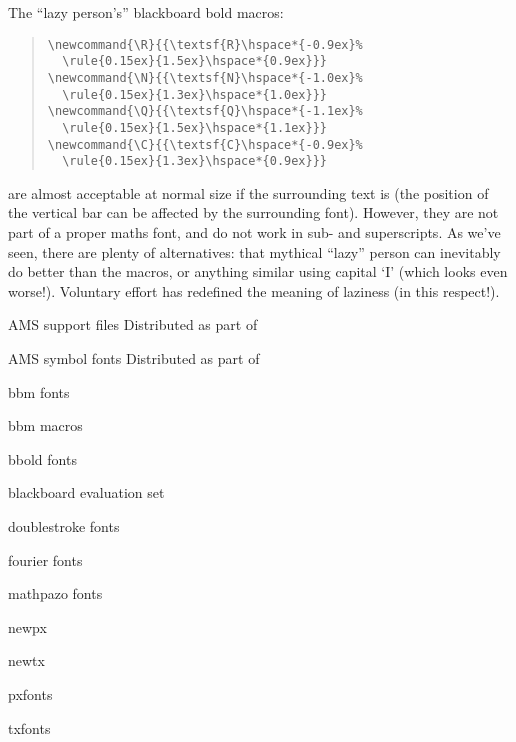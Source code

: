 The ``lazy person's'' blackboard bold macros:
\begin{quote}
\begin{verbatim}
\newcommand{\R}{{\textsf{R}\hspace*{-0.9ex}%
  \rule{0.15ex}{1.5ex}\hspace*{0.9ex}}}
\newcommand{\N}{{\textsf{N}\hspace*{-1.0ex}%
  \rule{0.15ex}{1.3ex}\hspace*{1.0ex}}}
\newcommand{\Q}{{\textsf{Q}\hspace*{-1.1ex}%
  \rule{0.15ex}{1.5ex}\hspace*{1.1ex}}}
\newcommand{\C}{{\textsf{C}\hspace*{-0.9ex}%
  \rule{0.15ex}{1.3ex}\hspace*{0.9ex}}}
\end{verbatim}
\end{quote}
are almost acceptable at normal size if the surrounding text is
 (the position of the vertical bar can be affected by
the surrounding font).  However, they are not part of a proper maths font,
and do not work in sub- and superscripts.  As we've seen, there are
plenty of alternatives: that mythical ``lazy'' person can inevitably
do better than the macros, or anything similar using capital `I'
(which looks even worse!).  Voluntary  \AllTeX{} effort has redefined
the meaning of laziness (in this respect!).
\begin{ctanrefs}
\item[AMS support files]Distributed as part of 
\item[AMS symbol fonts]Distributed as part of 
\item[bbm fonts]
\item[bbm macros]
\item[bbold fonts]
\item[blackboard \nothtml{\rmfamily}evaluation set]
\item[doublestroke fonts]
\item[fourier fonts]
\item[mathpazo fonts]
\item[newpx]
\item[newtx]
\item[pxfonts]
\item[txfonts]
\end{ctanrefs}

